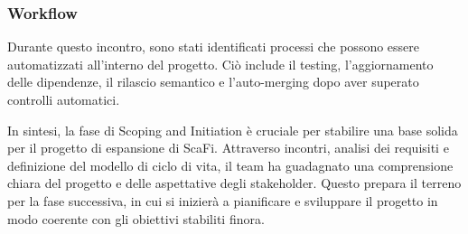 \subsubsection{Workflow}
Durante questo incontro, sono stati identificati processi che possono essere automatizzati all'interno del progetto. Ciò include il testing, 
l'aggiornamento delle dipendenze, il rilascio semantico e l'auto-merging dopo aver superato controlli automatici.

In sintesi, la fase di Scoping and Initiation è cruciale per stabilire una base solida per il progetto di espansione di ScaFi. 
Attraverso incontri, analisi dei requisiti e definizione del modello di ciclo di vita, il team ha guadagnato una comprensione chiara 
del progetto e delle aspettative degli stakeholder. Questo prepara il terreno per la fase successiva, in cui si inizierà a pianificare 
e sviluppare il progetto in modo coerente con gli obiettivi stabiliti finora.
